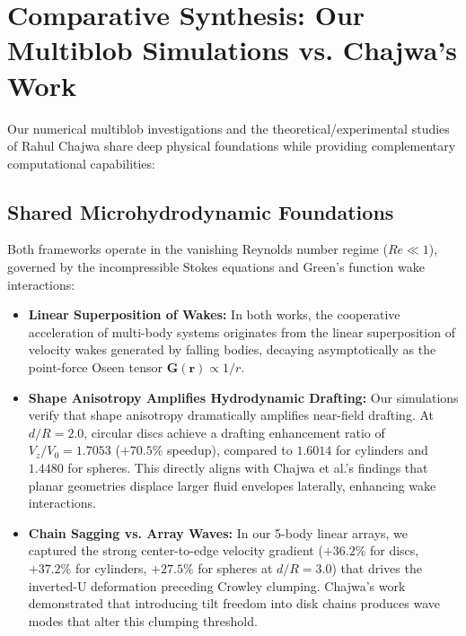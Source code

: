 \documentclass[11pt,a4paper]{article}
\begin{document}
\section{Comparative Synthesis: Our Multiblob Simulations vs. Chajwa's Work}

Our numerical multiblob investigations and the theoretical/experimental studies of Rahul Chajwa share deep physical foundations while providing complementary computational capabilities:

\subsection{Shared Microhydrodynamic Foundations}
Both frameworks operate in the vanishing Reynolds number regime ($Re \ll 1$), governed by the incompressible Stokes equations and Green's function wake interactions:
\begin{itemize}
    \item \textbf{Linear Superposition of Wakes:} In both works, the cooperative acceleration of multi-body systems originates from the linear superposition of velocity wakes generated by falling bodies, decaying asymptotically as the point-force Oseen tensor $\mathbf{G}(\mathbf{r}) \propto 1/r$.
    \item \textbf{Shape Anisotropy Amplifies Hydrodynamic Drafting:} Our simulations verify that shape anisotropy dramatically amplifies near-field drafting. At $d/R = 2.0$, circular discs achieve a drafting enhancement ratio of $V_z / V_0 = 1.7053$ ($+70.5\%$ speedup), compared to $1.6014$ for cylinders and $1.4480$ for spheres. This directly aligns with Chajwa et al.'s findings that planar geometries displace larger fluid envelopes laterally, enhancing wake interactions.
    \item \textbf{Chain Sagging vs. Array Waves:} In our 5-body linear arrays, we captured the strong center-to-edge velocity gradient ($+36.2\%$ for discs, $+37.2\%$ for cylinders, $+27.5\%$ for spheres at $d/R = 3.0$) that drives the inverted-U deformation preceding Crowley clumping. Chajwa's work demonstrated that introducing tilt freedom into disk chains produces wave modes that alter this clumping threshold.
\end{itemize}
\end{document}
